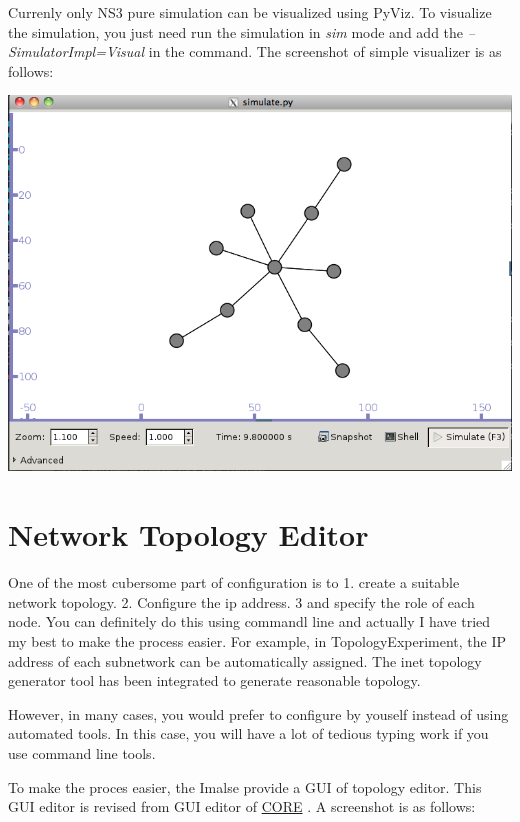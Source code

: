 \documentclass[letterpaper,10pt,english]{sphinxmanual}
\begin{document}
Currenly only NS3 pure simulation can be visualized using PyViz. To visualize
the simulation, you just need run the simulation in \emph{sim} mode and add the
\emph{--SimulatorImpl=Visual} in the command. The screenshot of simple visualizer is
as follows:

{\hfill\includegraphics{Visualizer_screenshot.png}\hfill}


\section{Network Topology Editor}
\label{index:network-topology-editor}
One of the most cubersome part of configuration is to 1. create a suitable network
topology. 2. Configure the ip address. 3 and specify the role of each node. You
can definitely do this using commandl line and actually I have tried my best to
make the process easier. For example, in TopologyExperiment, the IP address of
each subnetwork can be automatically assigned. The inet topology generator tool has been
integrated to generate reasonable topology.

However, in many cases, you would prefer to configure by youself instead of
using automated tools. In this case, you will have a lot of tedious typing work
if you use command line tools.

To make the proces easier, the Imalse provide a GUI of topology editor. This GUI
editor is revised from GUI editor of \href{http://cs.itd.nrl.navy.mil/work/core/}{CORE} . A screenshot
is as follows:
\end{document}
